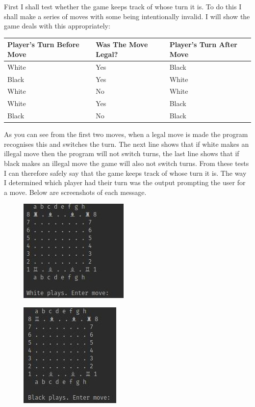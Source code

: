\documentclass[a4paper]{article}
\begin{document}
First I shall test whether the game keeps track of whose turn it is. To do this I shall make a series of moves with some being intentionally invalid. I will show the game deals with this appropriately:
\begin{table}[H]
\begin{tabular}{|l|l|l|}
\hline
\textbf{Player's Turn Before Move} & \textbf{Was The Move Legal?} & \textbf{Player's Turn After Move} \\ \hline
White                              & Yes                          & Black                             \\ \hline
Black                              & Yes                          & White                             \\ \hline
White                              & No                           & White                             \\ \hline
White                              & Yes                          & Black                             \\ \hline
Black                              & No                           & Black                             \\ \hline
\end{tabular}
\end{table}
As you can see from the first two moves, when a legal move is made the program recognises this and switches the turn. The next line shows that if white makes an illegal move then the program will not switch turns, the last line shows that if black makes an illegal move the game will also not switch turns. From these tests I can therefore safely say that the game keeps track of whose turn it is. The way I determined which player had their turn was the output prompting the user for a move. Below are screenshots of each message.
\begin{figure}[H]
\centering
\includegraphics[scale=2.5]{whitePlays}
\end{figure}
\begin{figure}[H]
\centering
\includegraphics[scale=2.5]{blackPlays}
\end{figure}
\end{document}
